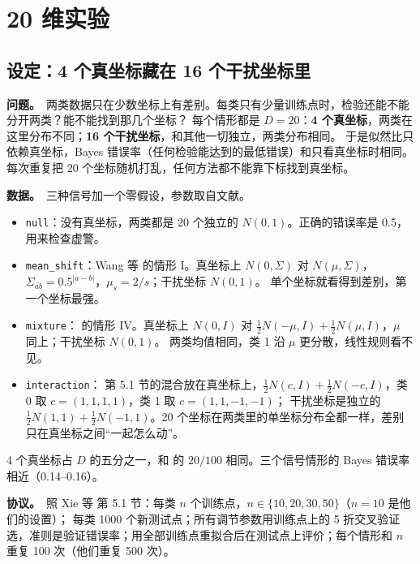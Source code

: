 \documentclass[11pt,a4paper,fontset=none]{ctexart}
\theoremstyle{definition}
\newcommand{\para}[1]{\par\smallskip\noindent\textbf{#1}\ }
\begin{document}
\section{20 维实验}\label{sec:experiments}
\subsection{设定：4 个真坐标藏在 16 个干扰坐标里}
\para{问题。}两类数据只在少数坐标上有差别。每类只有少量训练点时，检验还能不能分开两类？能不能找到那几个坐标？
每个情形都是 $D=20$：\textbf{4 个真坐标}，两类在这里分布不同；\textbf{16 个干扰坐标}，和其他一切独立，两类分布相同。
于是似然比只依赖真坐标，Bayes 错误率（任何检验能达到的最低错误）和只看真坐标时相同。
每次重复把 20 个坐标随机打乱，任何方法都不能靠下标找到真坐标。

\para{数据。}三种信号加一个零假设，参数取自文献。
\begin{itemize}
\item \texttt{null}：没有真坐标，两类都是 20 个独立的 $N(0,1)$。正确的错误率是 0.5，用来检查虚警。
\item \texttt{mean\_shift}：Wang 等 \cite{wang2023variable} 的情形 I。真坐标上 $N(0,\Sigma)$ 对 $N(\mu,\Sigma)$，$\Sigma_{ab}=0.5^{|a-b|}$，$\mu_s=2/s$；干扰坐标 $N(0,1)$。
单个坐标就看得到差别，第一个坐标最强。
\item \texttt{mixture}：\cite{wang2023variable} 的情形 IV。真坐标上 $N(0,I)$ 对 $\tfrac12N(-\mu,I)+\tfrac12N(\mu,I)$，$\mu$ 同上；干扰坐标 $N(0,1)$。
两类均值相同，类 1 沿 $\mu$ 更分散，线性规则看不见。
\item \texttt{interaction}：\cite{xie2021robust} 第 5.1 节的混合放在真坐标上，$\tfrac12N(c,I)+\tfrac12N(-c,I)$，类 0 取 $c=(1,1,1,1)$，类 1 取 $c=(1,1,-1,-1)$；
干扰坐标是独立的 $\tfrac12N(1,1)+\tfrac12N(-1,1)$。20 个坐标在两类里的单坐标分布全都一样，差别只在真坐标之间“一起怎么动”。
\end{itemize}
4 个真坐标占 $D$ 的五分之一，和 \cite{wang2023variable} 的 $20/100$ 相同。三个信号情形的 Bayes 错误率相近（0.14--0.16）。

\para{协议。}照 Xie 等 \cite{xie2021robust} 第 5.1 节：每类 $n$ 个训练点，$n\in\{10,20,30,50\}$（$n=10$ 是他们的设置）；
每类 1000 个新测试点；所有调节参数用训练点上的 5 折交叉验证选，准则是验证错误率；用全部训练点重拟合后在测试点上评价；每个情形和 $n$ 重复 100 次（他们重复 500 次）。
\end{document}

